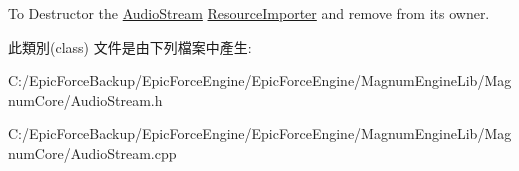 To Destructor the \hyperlink{class_magnum_1_1_audio_stream}{Audio\+Stream} \hyperlink{class_magnum_1_1_audio_stream_1_1_resource_importer}{Resource\+Importer} and remove from its owner. 

此類別(class) 文件是由下列檔案中產生\+:\begin{DoxyCompactItemize}
\item 
C\+:/\+Epic\+Force\+Backup/\+Epic\+Force\+Engine/\+Epic\+Force\+Engine/\+Magnum\+Engine\+Lib/\+Magnum\+Core/Audio\+Stream.\+h\item 
C\+:/\+Epic\+Force\+Backup/\+Epic\+Force\+Engine/\+Epic\+Force\+Engine/\+Magnum\+Engine\+Lib/\+Magnum\+Core/Audio\+Stream.\+cpp\end{DoxyCompactItemize}

